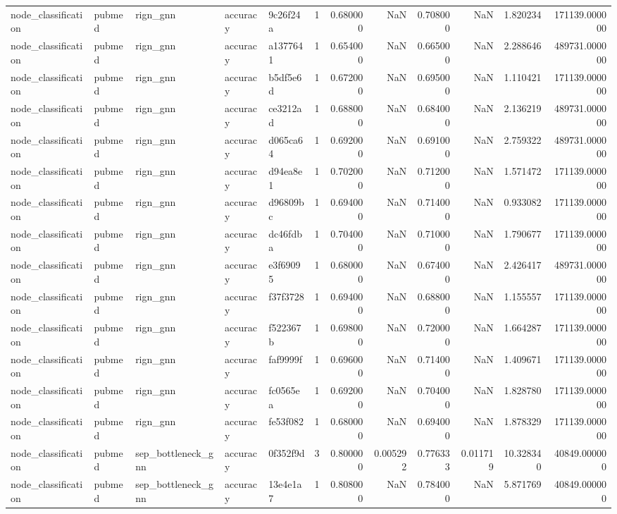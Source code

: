 \begin{tabular}{lllllrrrrrrr}
node_classification & pubmed & rign_gnn & accuracy & 9c26f24a & 1 & 0.680000 & NaN & 0.708000 & NaN & 1.820234 & 171139.000000 \\
node_classification & pubmed & rign_gnn & accuracy & a1377641 & 1 & 0.654000 & NaN & 0.665000 & NaN & 2.288646 & 489731.000000 \\
node_classification & pubmed & rign_gnn & accuracy & b5df5e6d & 1 & 0.672000 & NaN & 0.695000 & NaN & 1.110421 & 171139.000000 \\
node_classification & pubmed & rign_gnn & accuracy & ce3212ad & 1 & 0.688000 & NaN & 0.684000 & NaN & 2.136219 & 489731.000000 \\
node_classification & pubmed & rign_gnn & accuracy & d065ca64 & 1 & 0.692000 & NaN & 0.691000 & NaN & 2.759322 & 489731.000000 \\
node_classification & pubmed & rign_gnn & accuracy & d94ea8e1 & 1 & 0.702000 & NaN & 0.712000 & NaN & 1.571472 & 171139.000000 \\
node_classification & pubmed & rign_gnn & accuracy & d96809bc & 1 & 0.694000 & NaN & 0.714000 & NaN & 0.933082 & 171139.000000 \\
node_classification & pubmed & rign_gnn & accuracy & dc46fdba & 1 & 0.704000 & NaN & 0.710000 & NaN & 1.790677 & 171139.000000 \\
node_classification & pubmed & rign_gnn & accuracy & e3f69095 & 1 & 0.680000 & NaN & 0.674000 & NaN & 2.426417 & 489731.000000 \\
node_classification & pubmed & rign_gnn & accuracy & f37f3728 & 1 & 0.694000 & NaN & 0.688000 & NaN & 1.155557 & 171139.000000 \\
node_classification & pubmed & rign_gnn & accuracy & f522367b & 1 & 0.698000 & NaN & 0.720000 & NaN & 1.664287 & 171139.000000 \\
node_classification & pubmed & rign_gnn & accuracy & faf9999f & 1 & 0.696000 & NaN & 0.714000 & NaN & 1.409671 & 171139.000000 \\
node_classification & pubmed & rign_gnn & accuracy & fc0565ea & 1 & 0.692000 & NaN & 0.704000 & NaN & 1.828780 & 171139.000000 \\
node_classification & pubmed & rign_gnn & accuracy & fe53f082 & 1 & 0.680000 & NaN & 0.694000 & NaN & 1.878329 & 171139.000000 \\
node_classification & pubmed & sep_bottleneck_gnn & accuracy & 0f352f9d & 3 & 0.800000 & 0.005292 & 0.776333 & 0.011719 & 10.328340 & 40849.000000 \\
node_classification & pubmed & sep_bottleneck_gnn & accuracy & 13e4e1a7 & 1 & 0.808000 & NaN & 0.784000 & NaN & 5.871769 & 40849.000000 \\

\end{tabular}

